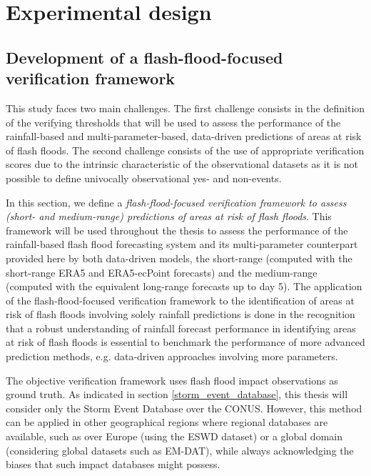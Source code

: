 \chapter{Experimental design}
\label{experimental_design}
\graphicspath{{chapter_04/figures}{chapter_04/tables}}


\section{Development of a flash-flood-focused verification framework}

This study faces two main challenges. The first challenge consists in the definition of the verifying thresholds that will be used to assess the performance of the rainfall-based and multi-parameter-based, data-driven predictions of areas at risk of flash floods. The second challenge consists of the use of appropriate verification scores due to the intrinsic characteristic of the observational datasets as it is not possible to define univocally observational yes- and non-events. 

In this section, we define a \textit{flash-flood-focused verification framework to assess (short- and medium-range) predictions of areas at risk of flash floods}. This framework will be used throughout the thesis to assess the performance of the rainfall-based flash flood forecasting system and its multi-parameter counterpart provided here by both data-driven models, the short-range (computed with the short-range ERA5 and ERA5-ecPoint forecasts) and the medium-range (computed with the equivalent long-range forecasts up to day 5). The application of the flash-flood-focused verification framework to the identification of areas at risk of flash floods involving solely rainfall predictions is done in the recognition that a robust understanding of rainfall forecast performance in identifying areas at risk of flash floods is essential to benchmark the performance of more advanced prediction methods, e.g. data-driven approaches involving more parameters.

The objective verification framework uses flash flood impact observations as ground truth. As indicated in section \ref{storm_event_database}, this thesis will consider only the Storm Event Database over the CONUS. However, this method can be applied in other geographical regions where regional databases are available, such as over Europe (using the ESWD dataset) or a global domain (considering global datasets such as EM-DAT), while always acknowledging the biases that such impact databases might possess. 



